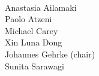 \vspace{0.1in}

\begin{flushright}
 \\
\indent Anastasia Ailamaki\\
\indent Paolo Atzeni\\
\indent Michael Carey \\
\indent Xin Luna Dong \\
\indent Johannes Gehrke (chair) \\
\indent Sunita Sarawagi
\end{flushright}
% 
